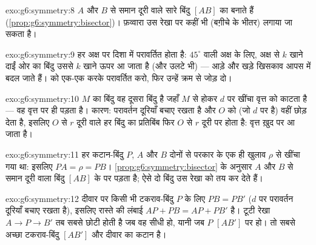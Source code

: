\begin{solution}{exo:g6:symmetry:8}
$A$ और $B$ से समान दूरी वाले सारे बिंदु $[AB]$ का  बनाते हैं (\cref{prop:g6:symmetry:bisector})।
फ़व्वारा उस रेखा पर कहीं भी (बग़ीचे के भीतर) लगाया जा सकता है।
\end{solution}

\begin{solution}{exo:g6:symmetry:9}
हर  अक्ष पर  दिशा में परावर्तित होता है: $45^\circ$
वाली अक्ष के लिए, अक्ष से $k$ खाने दाईं ओर का बिंदु उससे
$k$ खाने ऊपर आ जाता है (और उलटे भी) --- आड़े और खड़े खिसकाव आपस
में बदल जाते हैं।  को एक-एक करके परावर्तित करो, फिर
उन्हें क्रम से जोड़ दो।
\end{solution}

\begin{solution}{exo:g6:symmetry:10}
$M$ का  बिंदु वह दूसरा बिंदु है जहाँ $M$ से होकर $d$ पर
खींचा  वृत्त को काटता है --- वह वृत्त पर ही पड़ता है। कारण:
परावर्तन दूरियाँ बचाए रखता है और $O$ को (जो $d$ पर है) वहीं
छोड़ देता है, इसलिए $O$ से $r$ दूरी वाले हर बिंदु का प्रतिबिंब
फिर $O$ से $r$ दूरी पर होता है: वृत्त ख़ुद पर आ जाता है।
\end{solution}

\begin{solution}{exo:g6:symmetry:11}
हर कटान-बिंदु $P$, $A$ और $B$ दोनों से परकार के एक ही खुलाव
$\rho$ से खींचा गया था: इसलिए $PA = \rho = PB$।
\cref{prop:g6:symmetry:bisector} के अनुसार $A$ और $B$ से समान
दूरी वाला बिंदु $[AB]$ के  पर पड़ता है; ऐसे दो
बिंदु उस रेखा को तय कर देते हैं।
\end{solution}

\begin{solution}{exo:g6:symmetry:12}
दीवार पर किसी भी टकराव-बिंदु $P$ के लिए $PB = PB'$ ($d$ पर
परावर्तन दूरियाँ बचाए रखता है), इसलिए रास्ते की लंबाई
$AP + PB = AP + PB'$ है। टूटी रेखा $A \to P \to B'$ तब सबसे छोटी
होती है जब वह सीधी हो, यानी जब $P$  $[AB']$ पर हो। तो
सबसे अच्छा टकराव-बिंदु $[AB']$ और दीवार का कटान है।
\end{solution}

